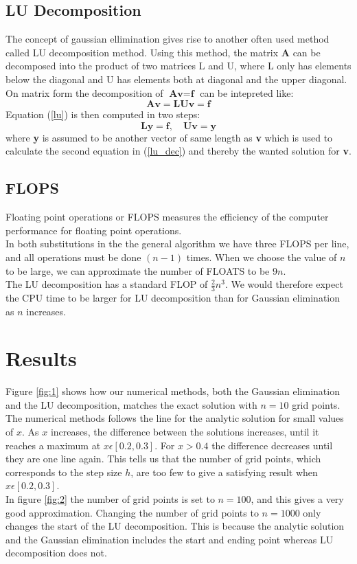 \documentclass{article}
\begin{document}
\subsection{LU Decomposition}
The concept of gaussian ellimination gives rise to another often used method called LU decomposition method. Using this method, the matrix $\textbf{A}$ can be decomposed into the product of two matrices L and U, where L only has elements below the diagonal and U has elements  both at diagonal and the upper diagonal. \\
On matrix form the decomposition of $\textbf{Av} = \textbf{f}$ can be intepreted like:
\begin{equation} 
\label{lu}
 \textbf{Av} = \textbf{LUv} = \textbf{f}
\end{equation}
Equation (\ref{lu}) is then computed in two steps:
\begin{equation}
\label{lu_dec}
\textbf{Ly} = \textbf{f},     \quad  \textbf{Uv} = \textbf{y} 
\end{equation}
where \textbf{y} is assumed to be another vector of same length as \textbf{v} which is used to calculate the second equation in  (\ref{lu_dec}) and thereby the wanted solution for \textbf{v}.


\subsection{FLOPS}
Floating point operations or FLOPS measures the efficiency of the computer performance for floating point operations. \\
In both substitutions in the the general algorithm we have three FLOPS per line, and all operations must be done $(n-1)$ times. When we choose the value of $n$ to be large, we can approximate the number of FLOATS to be $9n$. \\
The LU decomposition has a standard FLOP of $\frac{2}{3}n^{3}$. We would therefore expect the CPU time to be larger for LU decomposition than for Gaussian elimination as $n$ increases. 


\section{Results}
Figure \ref{fig:1} shows how our numerical methods, both the Gaussian elimination and the LU decomposition, matches the exact solution with $n=10$ grid points. The numerical methods follows the line for the analytic solution for small values of $x$. As $x$ increases, the difference between the solutions increases, until it reaches a maximum at $x \epsilon [0.2, 0.3]$. For $x > 0.4$ the difference decreases until they are one line again. This tells us that the number of grid points, which corresponds to the step size $h$, are too few to give a satisfying result when $x \epsilon [0.2, 0.3] $. \\
In figure \ref{fig:2} the number of grid points is set to $n=100$, and this gives a very good approximation. Changing the number of grid points to $n=1000$ only changes the start of the LU decomposition. This is because the analytic solution and the Gaussian elimination includes the start and ending point whereas LU decomposition does not. 
\end{document}
